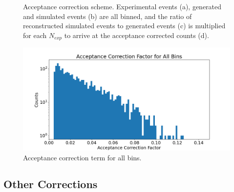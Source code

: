 \begin{figure}[H]
        \hfill
    
        \caption[Acceptance Correction Scheme]{Acceptance correction scheme. Experimental events (a), generated and simulated events (b) are all binned, and the ratio of reconstructed simulated events to generated events (c) is multiplied for each $N_{exp}$ to arrive at the acceptance corrected counts (d).}\label{fig:acccorr}
\end{figure}



\begin{figure}
    \centering
    \includegraphics[width=\textwidth]{Chapters/Ch4-BaseAnalysis/4_Correction_Factors/A3_a_acceptance_correction/pics/acccorr.png}
    \caption{Acceptance correction term for all bins.}
    \label{fig:acccorrdist}
\end{figure}




\subsection{Other Corrections}

